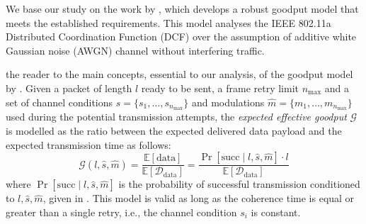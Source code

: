 \documentclass[twoside,nohyper]{tufte-book}
\theoremstyle{definition}
\theoremstyle{definition}
\theoremstyle{definition}
\theoremstyle{remark}
\begin{document}
\pagebreak

We base our study on the work by \citet{Qiao2002}\cite{Qiao2002}, which
develops a robust goodput model that meets the established requirements.
This model analyses the IEEE 802.11a Distributed Coordination Function
(DCF) over the assumption of additive white Gaussian noise (AWGN)
channel without interfering traffic.

 the reader to the main concepts,
essential to our analysis, of the goodput model by \citet{Qiao2002}.
Given a packet of length \(l\) ready to be sent, a frame retry limit
\(n_\mathrm{max}\) and a set of channel conditions
\(\hat{s}=\{s_1, \ldots, s_{n_\mathrm{max}}\}\) and modulations
\(\hat{m}=\{m_1, \ldots, m_{n_\mathrm{max}}\}\) used during the
potential transmission attempts, the \emph{expected effective goodput}
\(\mathcal{G}\) is modelled as the ratio between the expected delivered
data payload and the expected transmission time as follows:
%
\begin{equation}
 \mathcal{G}(l, \hat{s}, \hat{m}) = \frac{{\mathbb E}\left[ \mathrm{data} \right]}{{\mathbb E}\left[ \mathcal{D}_\mathrm{data} \right]} = \frac{\Pr[\mathrm{succ} \mid l, \hat{s}, \hat{m}]\cdot l}{{\mathbb E}\left[ \mathcal{D}_\mathrm{data} \right]}
 \label{eq:goodput}
\end{equation}
%
where \(\Pr[\mathrm{succ} \mid l, \hat{s}, \hat{m}]\) is the probability
of successful transmission conditioned to \(l, \hat{s}, \hat{m}\), given
in \citet[Equation (5)]{Qiao2002}. This model is valid as long as the
coherence time is equal or greater than a single retry, i.e., the
channel condition \(s_i\) is constant.
\end{document}
